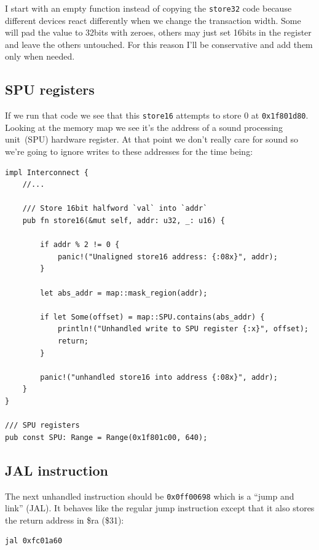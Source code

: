 \documentclass[a4paper]{article}
\newcommand{\code}[1] {\texttt{#1}}
\begin{document}
I start with an empty function instead of copying the \code{store32}
code because different devices react differently when we change the
transaction width. Some will pad the value to 32bits with zeroes,
others may just set 16bits in the register and leave the others
untouched. For this reason I'll be conservative and add them only when
needed.

\subsection{SPU registers}

If we run that code we see that this \code{store16} attempts to store
0 at \code{0x1f801d80}. Looking at the memory map we see it's the
address of a sound processing unit~(SPU) hardware register. At that
point we don't really care for sound so we're going to ignore writes
to these addresses for the time being:

\begin{lstlisting}
impl Interconnect {
    //...

    /// Store 16bit halfword `val` into `addr`
    pub fn store16(&mut self, addr: u32, _: u16) {

        if addr % 2 != 0 {
            panic!("Unaligned store16 address: {:08x}", addr);
        }

        let abs_addr = map::mask_region(addr);

        if let Some(offset) = map::SPU.contains(abs_addr) {
            println!("Unhandled write to SPU register {:x}", offset);
            return;
        }

        panic!("unhandled store16 into address {:08x}", addr);
    }
}

/// SPU registers
pub const SPU: Range = Range(0x1f801c00, 640);
\end{lstlisting}

\subsection{JAL instruction}

The next unhandled instruction should be \code{0x0ff00698} which is a
``jump and link'' (JAL). It behaves like the regular jump instruction
except that it also stores the return address in \$ra (\$31):

\begin{lstlisting}[language=assembly]
jal 0xfc01a60
\end{lstlisting}
\end{document}
